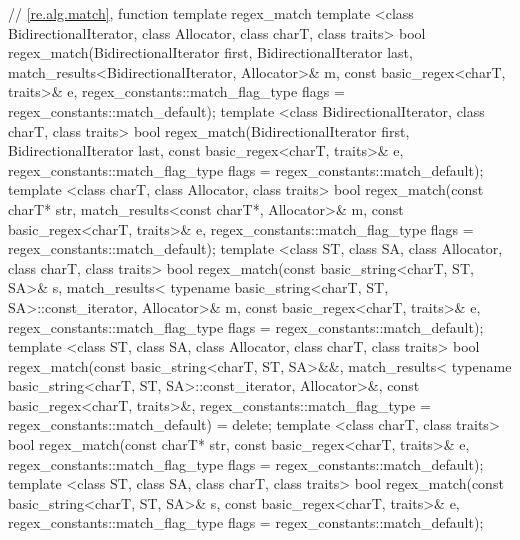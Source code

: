 \begin{codeblock}
{  // \ref{re.alg.match}, function template regex_match
  template <class BidirectionalIterator, class Allocator,
      class charT, class traits>
    bool regex_match(BidirectionalIterator first, BidirectionalIterator last,
                     match_results<BidirectionalIterator, Allocator>& m,
                     const basic_regex<charT, traits>& e,
                     regex_constants::match_flag_type flags =
                       regex_constants::match_default);
  template <class BidirectionalIterator, class charT, class traits>
  bool regex_match(BidirectionalIterator first, BidirectionalIterator last,
                   const basic_regex<charT, traits>& e,
                   regex_constants::match_flag_type flags =
                     regex_constants::match_default);
  template <class charT, class Allocator, class traits>
    bool regex_match(const charT* str, match_results<const charT*, Allocator>& m,
                     const basic_regex<charT, traits>& e,
                     regex_constants::match_flag_type flags =
                       regex_constants::match_default);
  template <class ST, class SA, class Allocator, class charT, class traits>
    bool regex_match(const basic_string<charT, ST, SA>& s,
                     match_results<
                       typename basic_string<charT, ST, SA>::const_iterator,
                       Allocator>& m,
                     const basic_regex<charT, traits>& e,
                     regex_constants::match_flag_type flags =
                       regex_constants::match_default);
  template <class ST, class SA, class Allocator, class charT, class traits>
    bool regex_match(const basic_string<charT, ST, SA>&&,
                     match_results<
                       typename basic_string<charT, ST, SA>::const_iterator,
                       Allocator>&,
                     const basic_regex<charT, traits>&,
                     regex_constants::match_flag_type =
                       regex_constants::match_default) = delete;
  template <class charT, class traits>
    bool regex_match(const charT* str,
                     const basic_regex<charT, traits>& e,
                     regex_constants::match_flag_type flags =
                       regex_constants::match_default);
  template <class ST, class SA, class charT, class traits>
    bool regex_match(const basic_string<charT, ST, SA>& s,
                     const basic_regex<charT, traits>& e,
                     regex_constants::match_flag_type flags =
                       regex_constants::match_default);

}
\end{codeblock}
